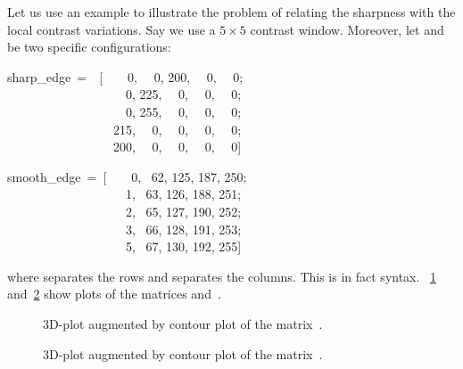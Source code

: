 Let us use an example to illustrate the problem of relating the sharpness with the local
contrast variations.  Say we use a $5 \times 5$ contrast window.  Moreover, let
 and  be two specific configurations:

\begin{literal}
  sharp\_edge~=~~[~~~~0,  ~~0,  200,  ~~0,  ~~0; \\
    ~~~~~~~~~~~~~~~~~~~0,  225,  ~~0,  ~~0,  ~~0; \\
    ~~~~~~~~~~~~~~~~~~~0,  255,  ~~0,  ~~0,  ~~0; \\
    ~~~~~~~~~~~~~~~~~215,  ~~0,  ~~0,  ~~0,  ~~0; \\
    ~~~~~~~~~~~~~~~~~200,  ~~0,  ~~0,  ~~0,  ~~0]
\end{literal}

\begin{literal}
  smooth\_edge~=~[~~~~0,  ~62,  125,  187,  250; \\
    ~~~~~~~~~~~~~~~~~~~1,  ~63,  126,  188,  251; \\
    ~~~~~~~~~~~~~~~~~~~2,  ~65,  127,  190,  252; \\
    ~~~~~~~~~~~~~~~~~~~3,  ~66,  128,  191,  253; \\
    ~~~~~~~~~~~~~~~~~~~5,  ~67,  130,  192,  255]
\end{literal}

\noindent where \sample{;} separates the rows and \sample{,} separates the columns.  This is in
fact  syntax.  \figureName~\ref{fig:sharp-edge}
and~\ref{fig:smooth-edge} show plots of the matrices  and~.


\begin{figure}
  \begin{maxipage}
    \centering
  \end{maxipage}

  \caption[Sharp edge]{\label{fig:sharp-edge}%
    3D-plot augmented by contour plot of the matrix~.}
\end{figure}


\begin{figure}
  \begin{maxipage}
    \centering
  \end{maxipage}

  \caption[Smooth edge]{\label{fig:smooth-edge}%
    3D-plot augmented by contour plot of the matrix~.}
\end{figure}


